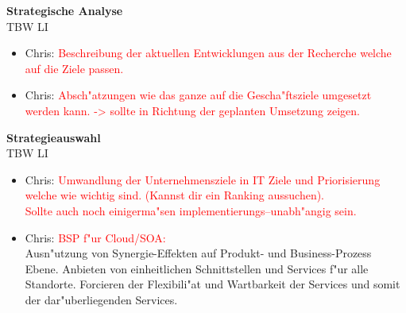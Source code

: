 \textbf{Strategische Analyse}\\
TBW LI\\
\begin{itemize}

	\item Chris: \textcolor{red}{Beschreibung der aktuellen Entwicklungen aus der Recherche welche auf die Ziele passen.}
	
	\item Chris: \textcolor{red}{Absch"atzungen wie das ganze auf die Gescha"ftsziele umgesetzt werden kann. -> sollte in Richtung der geplanten Umsetzung zeigen.}

\end{itemize}


\textbf{Strategieauswahl}\\
TBW LI\\

\begin{itemize}

	\item Chris: \textcolor{red}{Umwandlung der Unternehmensziele in IT Ziele und Priorisierung welche wie wichtig sind. (Kannst dir ein Ranking aussuchen).\\ Sollte auch noch einigerma"sen implementierungs--unabh"angig sein.}
	
	\item Chris: \textcolor{red}{BSP f"ur Cloud/SOA:}\\
	Ausn"utzung von Synergie-Effekten auf Produkt- und Business-Prozess Ebene. Anbieten von einheitlichen Schnittstellen und Services f"ur alle Standorte. Forcieren der Flexibili"at und Wartbarkeit der Services und somit der dar"uberliegenden Services.

\end{itemize}

